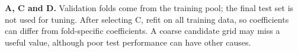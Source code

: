 \textbf{A, C and D.} Validation folds come from the training pool; the final test set is not used for tuning. After selecting C, refit on all training data, so coefficients can differ from fold-specific coefficients. A coarse candidate grid may miss a useful value, although poor test performance can have other causes.
